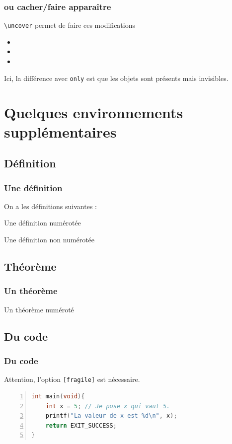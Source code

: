 \documentclass[12pt]{beamer}
\begin{document}
\begin{frame}
\frametitle{ou cacher/faire apparaître}
\texttt{\textbackslash uncover} permet de faire ces modifications
\begin{itemize}
\item {}
\item {}
\item {}
\end{itemize}

Ici, la différence avec \texttt{only} est que les objets sont présents mais invisibles.
\end{frame}


\section{Quelques environnements supplémentaires}

\subsection{Définition}
\begin{frame}
\frametitle{Une définition}
On a les définitions suivantes :
\begin{defi}{}{}
Une définition numérotée
\end{defi}

\begin{defi*}{}
Une définition non numérotée
\end{defi*}
\end{frame}

\subsection{Théorème}

\begin{frame}
\frametitle{Un théorème}

\begin{theo}{}{}
Un théorème numéroté
\end{theo}
\end{frame}

\subsection{Du code}

\begin{frame}[fragile]
\frametitle{Du code}

Attention, l'option \verb"[fragile]" est nécessaire.

\begin{lstlisting}[language=c, frame=single, numbers=left]
int main(void){
    int x = 5; // Je pose x qui vaut 5.
    printf("La valeur de x est %d\n", x);
    return EXIT_SUCCESS;
}
\end{lstlisting}
\end{frame}
\end{document}

